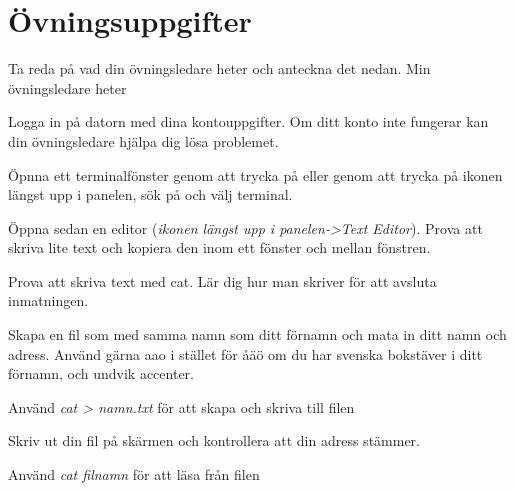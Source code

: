 \documentclass[a4paper,twocolumn]{book}
\begin{document}
\chapter{Övningsuppgifter}
\label{cha:uppgifter}
\begin{exercise}
  Ta reda på vad din övningsledare heter och anteckna det nedan.
	\vspace{5mm}
	Min övningsledare heter \dotfill
\end{exercise}

\begin{exercise}
	Logga in på datorn med dina kontouppgifter. Om ditt konto inte fungerar kan din övningsledare hjälpa dig lösa problemet.
\end{exercise}

\begin{exercise}
	Öpnna ett terminalfönster genom att trycka på  eller
	genom att trycka på ikonen längst upp i panelen, sök på  och välj terminal.	

Öppna sedan en editor (\emph{ikonen längst upp i panelen->Text Editor}).
Prova att skriva lite text och kopiera den inom ett fönster och mellan
fönstren.
\end{exercise}

\begin{exercise}
  Prova att skriva text med cat. Lär dig hur man
  skriver  för att avsluta inmatningen.
\end{exercise}

\begin{exercise}
  Skapa en fil som med samma namn som ditt förnamn och mata in ditt
  namn och adress. Använd gärna aao i stället för åäö om du har svenska
  bokstäver i ditt förnamn, och undvik accenter.
  \begin{answer}
    Använd \emph{cat > namn.txt} för att skapa och skriva till filen
  \end{answer}
\end{exercise}

\begin{exercise}
  Skriv ut din fil på skärmen och kontrollera att din adress stämmer.
  \begin{answer}
    Använd \emph{cat filnamn} för att läsa från filen
  \end{answer}
\end{exercise}
\end{document}
